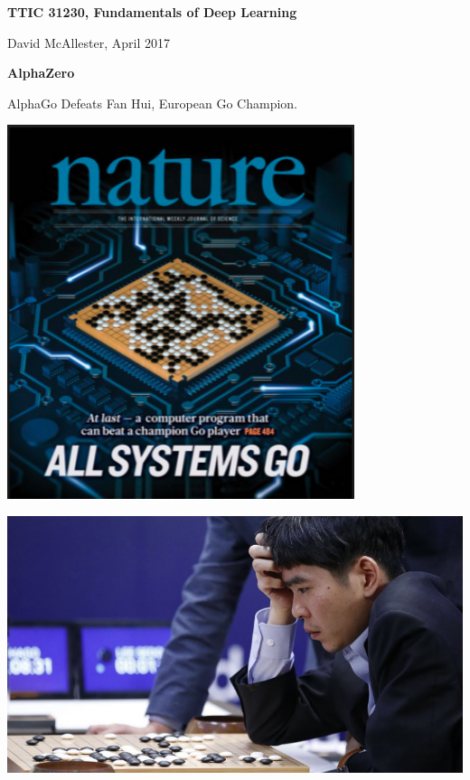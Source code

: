 




{\Huge

  \centerline{\bf TTIC 31230, Fundamentals of Deep Learning}
  \bigskip
  \centerline{David McAllester, April 2017}


\vfill
\centerline{\bf AlphaZero}
\vfill
\vfill


AlphaGo Defeats Fan Hui, European Go Champion.

\vfill
\centerline{\includegraphics[width=4in]{../images/alphago}}


\vfill
\centerline{\includegraphics[width=8in]{../images/alphagolee}}

}
